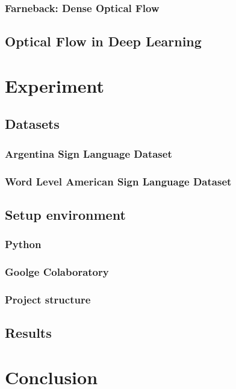 \documentclass[a4paper, 12pt]{article}
\begin{document}
\subsubsection{Farneback: Dense Optical Flow}
\subsection{Optical Flow in Deep Learning}

\section{Experiment}
\subsection{Datasets}
\subsubsection{Argentina Sign Language Dataset}
\subsubsection{Word Level American Sign Language Dataset}
\subsection{Setup environment}
\subsubsection{Python}
\subsubsection{Goolge Colaboratory}
\subsubsection{Project structure}
\subsection{Results}

\section{Conclusion}


\newpage

\newpage


\end{document}
